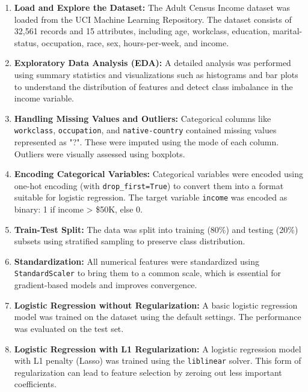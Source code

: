 \documentclass[a4paper,12pt]{article}
\begin{document}
\begin{enumerate}
    \item \textbf{Load and Explore the Dataset:} The Adult Census Income dataset was loaded from the UCI Machine Learning Repository. The dataset consists of 32,561 records and 15 attributes, including age, workclass, education, marital-status, occupation, race, sex, hours-per-week, and income.

    \item \textbf{Exploratory Data Analysis (EDA):} A detailed analysis was performed using summary statistics and visualizations such as histograms and bar plots to understand the distribution of features and detect class imbalance in the income variable.

    \item \textbf{Handling Missing Values and Outliers:} Categorical columns like \texttt{workclass}, \texttt{occupation}, and \texttt{native-country} contained missing values represented as "?". These were imputed using the mode of each column. Outliers were visually assessed using boxplots.

    \item \textbf{Encoding Categorical Variables:} Categorical variables were encoded using one-hot encoding (with \texttt{drop\_first=True}) to convert them into a format suitable for logistic regression. The target variable \texttt{income} was encoded as binary: 1 if income > \$50K, else 0.

    \item \textbf{Train-Test Split:} The data was split into training (80\%) and testing (20\%) subsets using stratified sampling to preserve class distribution. 

    \item \textbf{Standardization:} All numerical features were standardized using \texttt{StandardScaler} to bring them to a common scale, which is essential for gradient-based models and improves convergence.

    \item \textbf{Logistic Regression without Regularization:} A basic logistic regression model was trained on the dataset using the default settings. The performance was evaluated on the test set.

    \item \textbf{Logistic Regression with L1 Regularization:} A logistic regression model with L1 penalty (Lasso) was trained using the \texttt{liblinear} solver. This form of regularization can lead to feature selection by zeroing out less important coefficients.


\end{enumerate}
\end{document}
